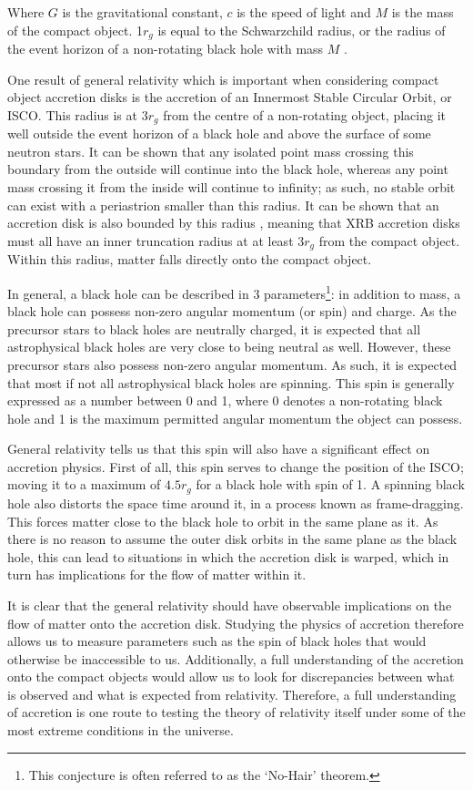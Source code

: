 Where $G$ is the gravitational constant, $c$ is the speed of light and $M$ is the mass of the compact object.  1$r_g$ is equal to the Schwarzchild radius, or the radius of the event horizon of a non-rotating black hole with mass $M$ \citep{Schwarzschild}.
\par One result of general relativity which is important when considering compact object accretion disks is the accretion of an Innermost Stable Circular Orbit, or ISCO.  This radius is at $3r_g$ from the centre of a non-rotating object, placing it well outside the event horizon of a black hole and above the surface of some neutron stars.  It can be shown that any isolated point mass crossing this boundary from the outside will continue into the black hole, whereas any point mass crossing it from the inside will continue to infinity; as such, no stable orbit can exist with a periastrion smaller than this radius. It can be shown that an accretion disk is also bounded by this radius \citep{Kozlowski_ISCO}, meaning that XRB accretion disks must all have an inner truncation radius at at least $3r_g$ from the compact object.  Within this radius, matter falls directly onto the compact object.
\par In general, a black hole can be described in 3 parameters\footnote{This conjecture is often referred to as the `No-Hair' theorem.}: in addition to mass, a black hole can possess non-zero angular momentum (or spin) and charge.  As the precursor stars to black holes are neutrally charged, it is expected that all astrophysical black holes are very close to being neutral as well.  However, these precursor stars also possess non-zero angular momentum.  As such, it is expected that most if not all astrophysical black holes are spinning.  This spin is generally expressed as a number between 0 and 1, where 0 denotes a non-rotating black hole and 1 is the maximum permitted angular momentum the object can possess.
\par General relativity tells us that this spin will also have a significant effect on accretion physics.  First of all, this spin serves to change the position of the ISCO; moving it to a maximum of $4.5r_g$ for a black hole with spin of 1.  A spinning black hole also distorts the space time around it, in a process known as frame-dragging.  This forces matter close to the black hole to orbit in the same plane as it.  As there is no reason to assume the outer disk orbits in the same plane as the black hole, this can lead to situations in which the accretion disk is warped, which in turn has implications for the flow of matter within it.
\par It is clear that the general relativity should have observable implications on the flow of matter onto the accretion disk.  Studying the physics of accretion therefore allows us to measure parameters such as the spin of black holes that would otherwise be inaccessible to us.  Additionally, a full understanding of the accretion onto the compact objects would allow us to look for discrepancies between what is observed and what is expected from relativity.  Therefore, a full understanding of accretion is one route to testing the theory of relativity itself under some of the most extreme conditions in the universe.